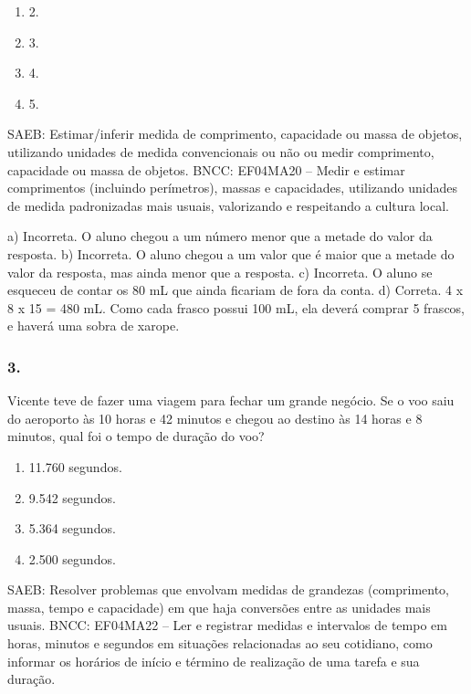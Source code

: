 \begin{enumerate}
\begin{escolha}
\begin{enumerate}
\begin{itemize}
\begin{itemize}
\begin{escolha}
\begin{enumerate}
\def\labelenumi{\alph{enumi})}
\item
  2.
\item
  3.
\item
  4.
\item
  5.
\end{enumerate}

SAEB: Estimar/inferir medida de comprimento, capacidade ou massa de objetos, utilizando unidades de medida convencionais ou não ou medir comprimento, capacidade ou massa de objetos.
BNCC: EF04MA20 -- Medir e estimar comprimentos (incluindo perímetros), massas e capacidades, utilizando
unidades de medida padronizadas mais usuais, valorizando e respeitando a cultura local.

a) Incorreta. O aluno chegou a um número menor que a metade do valor da resposta.
b) Incorreta. O aluno chegou a um valor que é maior que a metade do valor da resposta, mas ainda menor que a resposta.
c) Incorreta. O aluno se esqueceu de contar os 80 mL que ainda ficariam de fora da conta.
d) Correta. 4 x 8 x 15 = 480 mL. Como cada frasco possui 100 mL, ela deverá
comprar 5 frascos, e haverá uma sobra de xarope.

\subsubsection{3.}\label{section-51}

Vicente teve de fazer uma viagem para fechar um grande negócio. Se o voo
saiu do aeroporto às 10 horas e 42 minutos e chegou ao destino às 14
horas e 8 minutos, qual foi o tempo de duração do voo?

\begin{enumerate}
\def\labelenumi{\alph{enumi})}
\item
  11.760 segundos.
\item
  9.542 segundos.
\item
  5.364 segundos.
\item
  2.500 segundos.
\end{enumerate}

SAEB: Resolver problemas que envolvam medidas de grandezas (comprimento, massa, tempo e capacidade) em que haja conversões entre as unidades mais usuais.
BNCC: EF04MA22 -- Ler e registrar medidas e intervalos de tempo em horas, minutos e segundos em
situações relacionadas ao seu cotidiano, como informar os horários de início e término de realização
de uma tarefa e sua duração.


\end{escolha}
\end{itemize}
\end{itemize}
\end{enumerate}
\end{escolha}
\end{enumerate}
